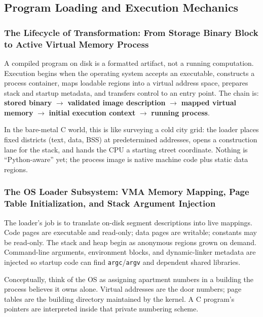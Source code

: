 \subsection{Program Loading and Execution Mechanics}

\subsubsection{The Lifecycle of Transformation: From Storage Binary Block to Active Virtual Memory Process}

A compiled program on disk is a formatted artifact, not a running computation. Execution begins when the operating system accepts an executable, constructs a process container, maps loadable regions into a virtual address space, prepares stack and startup metadata, and transfers control to an entry point. The chain is: \textbf{stored binary} $\rightarrow$ \textbf{validated image description} $\rightarrow$ \textbf{mapped virtual memory} $\rightarrow$ \textbf{initial execution context} $\rightarrow$ \textbf{running process}.

In the bare-metal C world, this is like surveying a cold city grid: the loader places fixed districts (text, data, BSS) at predetermined addresses, opens a construction lane for the stack, and hands the CPU a starting street coordinate. Nothing is ``Python-aware'' yet; the process image is native machine code plus static data regions.

\subsubsection{The OS Loader Subsystem: VMA Memory Mapping, Page Table Initialization, and Stack Argument Injection}

The loader's job is to translate on-disk segment descriptions into live mappings. Code pages are executable and read-only; data pages are writable; constants may be read-only. The stack and heap begin as anonymous regions grown on demand. Command-line arguments, environment blocks, and dynamic-linker metadata are injected so startup code can find \texttt{argc}/\texttt{argv} and dependent shared libraries.

Conceptually, think of the OS as assigning apartment numbers in a building the process believes it owns alone. Virtual addresses are the door numbers; page tables are the building directory maintained by the kernel. A C program's pointers are interpreted inside that private numbering scheme.

